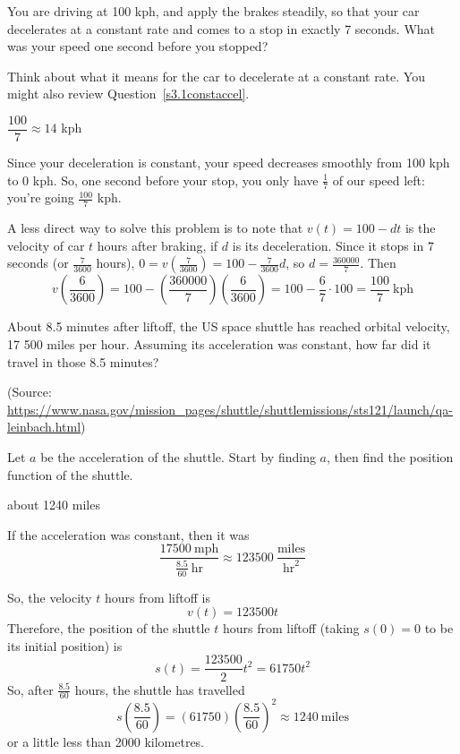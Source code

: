 \begin{question}
You are driving at 100 kph, and apply the brakes steadily, so that your car decelerates at a constant rate and comes to a stop in exactly 7 seconds. What was your speed one second before you stopped?
\end{question}
\begin{hint}
Think about what it means for the car to decelerate at a constant rate. You might also review Question~\ref{s3.1constaccel}.
\end{hint}
\begin{answer}
$\dfrac{100}{7}\approx 14$ kph
\end{answer}
\begin{solution}
Since your deceleration is constant, your speed decreases smoothly from 100 kph to 0 kph. So, one second before your stop, you only have $\frac{1}{7}$ of our speed left: you're going $\frac{100}{7}$ kph.

A less direct way to solve this problem is to note that $v(t)=100-dt$ is the velocity of car $t$ hours after braking, if $d$ is its deceleration. Since it stops in 7 seconds (or $\frac{7}{3600}$ hours), $0=v\left(\frac{7}{3600}\right)=100-\frac{7}{3600}d$, so $d=\frac{360000}{7}$.
Then \[v\left(\frac{6}{3600}\right)=100-\left(\frac{360000}{7}\right)\left(\frac{6}{3600}\right)=100-\frac{6}{7}\cdot100=\frac{100}{7}~\mathrm{kph}\]
\end{solution}

\begin{question}
About 8.5 minutes after liftoff, the US space shuttle has reached orbital velocity, 17 500 miles per hour. Assuming its acceleration was constant, how far did it travel in those 8.5 minutes?

(Source: {\scriptsize\url{https://www.nasa.gov/mission_pages/shuttle/shuttlemissions/sts121/launch/qa-leinbach.html}})
\end{question}
\begin{hint}
Let $a$ be the acceleration of the shuttle. Start by finding $a$, then find the position function of the shuttle.
\end{hint}
\begin{answer}
about 1240 miles
\end{answer}
\begin{solution}
If the acceleration was constant, then it was
\[\frac{17 500~\mathrm{mph}}{\frac{8.5}{60}~\mathrm{hr}} \approx 123 500 ~\frac{\mathrm{miles}}{\mathrm{hr}^2}\]

So, the velocity $t$ hours from liftoff is
\[v(t)=123500t\]
Therefore, the position of the shuttle $t$ hours from liftoff (taking $s(0)=0$ to be its initial position) is
\[s(t)=\frac{123500}{2}t^2=61750t^2\]
So, after $\frac{8.5}{60}$ hours, the shuttle has travelled
\[s\left(\frac{8.5}{60}\right)=(61750)\left(\frac{8.5}{60}\right)^2\approx 1240 ~\mathrm{miles}\]
or a little less than 2000 kilometres.
\end{solution}


